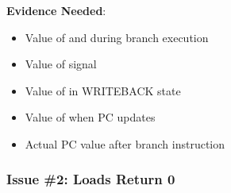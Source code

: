 \begin{record}
\textbf{Evidence Needed}:

\begin{itemize}
\tightlist
\item
  Value of  and  during branch execution
\item
  Value of  signal
\item
  Value of  in WRITEBACK state
\item
  Value of  when PC updates
\item
  Actual PC value after branch instruction
\end{itemize}

\end{record}

\subsubsection{Issue \#2: Loads Return 0}\label{cr:fix:rtl-debug-report:issue-2-loads-return-0}

